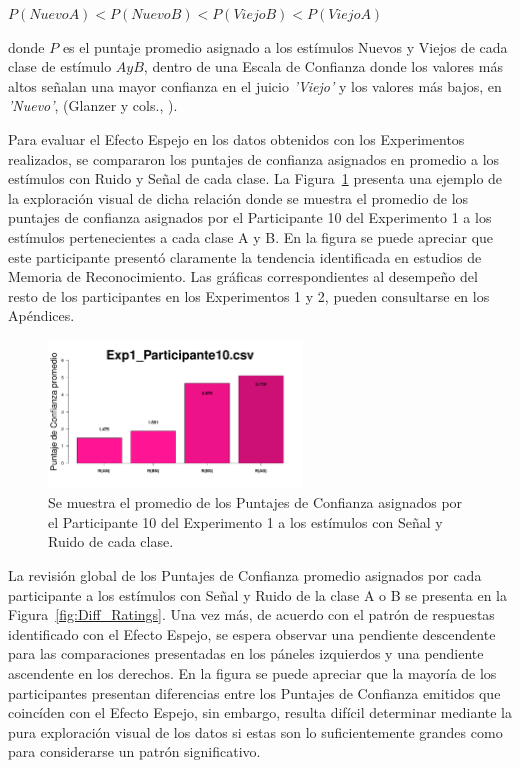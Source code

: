 \begin{center}
$P(NuevoA) < P(NuevoB) < P(ViejoB) < P(ViejoA)$\\
\end{center}
\begin{center}
donde $P$ es el puntaje promedio asignado a los estímulos Nuevos y Viejos de cada clase de estímulo $A y B$, dentro de una Escala de Confianza donde los valores más altos señalan una mayor confianza en el juicio \textit{'Viejo'} y los valores más bajos, en \textit{'Nuevo'}, (Glanzer y cols., \citeyear{Glanzer1993}).\\
\end{center}

Para evaluar el Efecto Espejo en los datos obtenidos con los Experimentos realizados, se compararon los puntajes de confianza asignados en promedio a los estímulos con Ruido y Señal de cada clase. La Figura~\ref{fig:MirrorRating_E1_P10} presenta una ejemplo de la exploración visual de dicha relación donde se muestra el promedio de los puntajes de confianza asignados por el Participante 10 del Experimento 1 a los estímulos pertenecientes a cada clase A y B. En la figura se puede apreciar que este participante presentó claramente la tendencia identificada en estudios de Memoria de Reconocimiento. Las gráficas correspondientes al desempeño del resto de los participantes en los Experimentos 1 y 2, pueden consultarse en los Apéndices.\\

\begin{figure}[th]
\centering
\includegraphics[width=0.60\textwidth]{Figures/MirrorRating_Exp1_P10}
\caption[Comparación entre Puntajes de Confianza asignados por Clase; Ejemplo]{Se muestra el promedio de los Puntajes de Confianza asignados por el Participante 10 del Experimento 1 a los estímulos con Señal y Ruido de cada clase.}
\label{fig:MirrorRating_E1_P10}
\end{figure}

La revisión global de los Puntajes de Confianza promedio asignados por cada participante a los estímulos con Señal y Ruido de la clase A o B se presenta en la Figura~\ref{fig:Diff_Ratings}. Una vez más, de acuerdo con el patrón de respuestas identificado con el Efecto Espejo, se espera observar una pendiente descendente para las comparaciones presentadas en los páneles izquierdos y una pendiente ascendente en los derechos. En la figura se puede apreciar que la mayoría de los participantes presentan diferencias entre los Puntajes de Confianza emitidos que coincíden con el Efecto Espejo, sin embargo, resulta difícil determinar mediante la pura exploración visual de los datos si estas son lo suficientemente grandes como para considerarse un patrón significativo.\\


